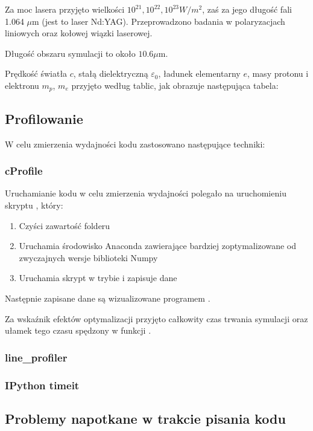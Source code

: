     Za moc lasera przyjęto wielkości $10^{21}, 10^{22}, 10^{23} W/m^2$, 
    zaś za jego długość fali 1.064 $\mu$m (jest to laser Nd:YAG). Przeprowadzono badania w polaryzacjach liniowych oraz
    kołowej wiązki laserowej.

    Długość obszaru symulacji to około $10.6 \mu$m.

    Prędkość światła $c$, stałą dielektryczną $\varepsilon_0$, ładunek
    elementarny $e$, masy protonu i elektronu $m_p$, $m_e$ przyjęto według
    tablic, jak obrazuje następująca tabela:


    \subsection{Profilowanie}
    W celu zmierzenia wydajności kodu zastosowano następujące techniki:
    \subsubsection{cProfile}
    Uruchamianie kodu w celu zmierzenia wydajności polegało na uruchomieniu skryptu , który:
    \begin{enumerate}
    \item Czyści zawartość folderu 
    \item Uruchamia środowisko Anaconda zawierające bardziej zoptymalizowane od zwyczajnych wersje biblioteki Numpy
    \item Uruchamia skrypt  w trybie  i zapisuje dane
    \end{enumerate}
    
    Następnie zapisane dane są wizualizowane programem .

    Za wskaźnik efektów optymalizacji przyjęto całkowity czas trwania symulacji oraz ułamek tego czasu spędzony w funkcji
    .
    \subsubsection{line\_profiler}
    \subsubsection{IPython timeit}

    \subsection{Problemy napotkane w trakcie pisania kodu} %
